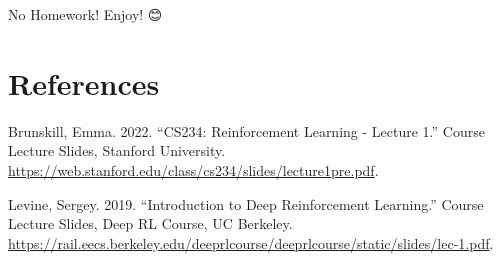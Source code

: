 \documentclass[
  letterpaper,
  DIV=11,
  numbers=noendperiod]{scrreprt}
\newlength{\cslhangindent}
\newenvironment{CSLReferences}[2] %
 {\begin{list}{}{%
  \setlength{\itemindent}{0pt}
  \setlength{\leftmargin}{0pt}
  \setlength{\parsep}{0pt}
  \ifodd #1
   \setlength{\leftmargin}{\cslhangindent}
   \setlength{\itemindent}{-1\cslhangindent}
  \fi
  \setlength{\itemsep}{#2\baselineskip}}}
 {\end{list}}
\begin{document}
\begin{tcolorbox}[enhanced jigsaw, arc=.35mm, toprule=.15mm, leftrule=.75mm, colback=white, left=2mm, colframe=quarto-callout-note-color-frame, rightrule=.15mm, opacityback=0, breakable, bottomrule=.15mm]

No Homework! Enjoy! 😊

\end{tcolorbox}


\chapter*{References}\label{references}


\label{refs}
\begin{CSLReferences}{1}{0}
Brunskill, Emma. 2022. {``CS234: Reinforcement Learning - Lecture 1.''}
Course Lecture Slides, Stanford University.
\url{https://web.stanford.edu/class/cs234/slides/lecture1pre.pdf}.

Levine, Sergey. 2019. {``Introduction to Deep Reinforcement Learning.''}
Course Lecture Slides, Deep RL Course, UC Berkeley.
\url{https://rail.eecs.berkeley.edu/deeprlcourse/deeprlcourse/static/slides/lec-1.pdf}.

\end{CSLReferences}
\end{document}
